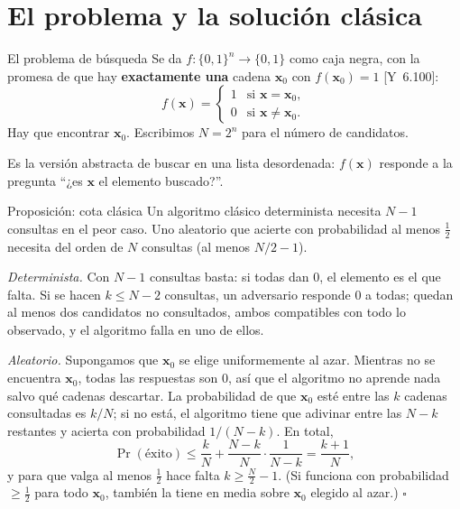 \documentclass[11pt, a4paper, twoside, openright]{report}
\newcommand{\bx}{\mathbf{x}}
\newcommand{\bits}[1]{\{0,1\}^{#1}}
\newcommand{\Yan}[1]{\textcolor{rosaviejo}{\small[Y~#1]}}  %
\begin{document}
\cleardoublepage
\section{El problema y la solución clásica}

\begin{teoria}{El problema de búsqueda}
Se da $f:\bits{n}\to\{0,1\}$ como caja negra, con la promesa de que hay \textbf{exactamente una} cadena $\bx_0$ con $f(\bx_0) = 1$ \Yan{6.100}:
\[ f(\bx) = \begin{cases} 1 & \text{si } \bx = \bx_0, \\ 0 & \text{si } \bx\neq\bx_0. \end{cases} \]
Hay que encontrar $\bx_0$. Escribimos $N = 2^n$ para el número de candidatos.
\end{teoria}

\noindent Es la versión abstracta de buscar en una lista desordenada: $f(\bx)$ responde a la pregunta ``¿es $\bx$ el elemento buscado?''.

\begin{teoria}{Proposición: cota clásica}
Un algoritmo clásico determinista necesita $N-1$ consultas en el peor caso. Uno aleatorio que acierte con probabilidad al menos $\frac12$ necesita del orden de $N$ consultas (al menos $N/2 - 1$).
\end{teoria}

\begin{demo}
\textit{Determinista.} Con $N-1$ consultas basta: si todas dan $0$, el elemento es el que falta. Si se hacen $k\le N-2$ consultas, un adversario responde $0$ a todas; quedan al menos dos candidatos no consultados, ambos compatibles con todo lo observado, y el algoritmo falla en uno de ellos.

\textit{Aleatorio.} Supongamos que $\bx_0$ se elige uniformemente al azar. Mientras no se encuentra $\bx_0$, todas las respuestas son $0$, así que el algoritmo no aprende nada salvo qué cadenas descartar. La probabilidad de que $\bx_0$ esté entre las $k$ cadenas consultadas es $k/N$; si no está, el algoritmo tiene que adivinar entre las $N-k$ restantes y acierta con probabilidad $1/(N-k)$. En total,
\[ \Pr(\text{éxito})\le\frac{k}{N} + \frac{N-k}{N}\cdot\frac{1}{N-k} = \frac{k+1}{N}, \]
y para que valga al menos $\frac12$ hace falta $k\ge\frac N2 - 1$. (Si funciona con probabilidad $\ge\frac12$ para todo $\bx_0$, también la tiene en media sobre $\bx_0$ elegido al azar.) \hfill$\square$
\end{demo}
\end{document}
